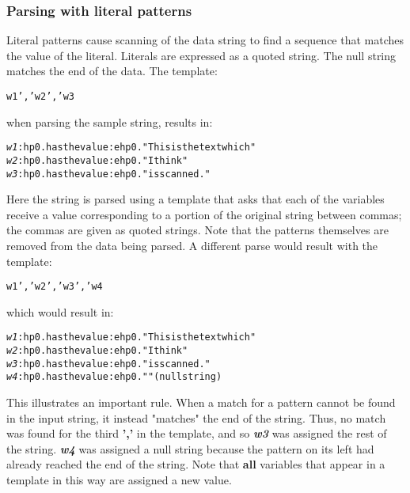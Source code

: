 \subsubsection{Parsing with literal patterns}
\index{,}
\index{,}
 Literal patterns cause scanning of the data string to find a
sequence that matches the value of the literal.  Literals are expressed
as a quoted string.  The null string matches the end of the data.
 The template:
\begin{alltt}
w1 ',' w2 ',' w3
\end{alltt}
when parsing the sample string, results in:
\begin{alltt}
\emph{w1} :hp0.has the value:ehp0. "This is  the text which"
\emph{w2} :hp0.has the value:ehp0. " I think"
\emph{w3} :hp0.has the value:ehp0. "  is scanned."
\end{alltt}
 Here the string is parsed using a template that asks that each of
the variables receive a value corresponding to a portion of the
original string between commas; the commas are given as quoted strings.
Note that the patterns themselves are removed from the data being
parsed.
 A different parse would result with the template:
\begin{alltt}
w1 ',' w2 ',' w3 ',' w4
\end{alltt}
which would result in:
\begin{alltt}
\emph{w1} :hp0.has the value:ehp0. "This is  the text which"
\emph{w2} :hp0.has the value:ehp0. " I think"
\emph{w3} :hp0.has the value:ehp0. "  is scanned."
\emph{w4} :hp0.has the value:ehp0. ""  (null string)
\end{alltt}
 This illustrates an important rule.  When a match for a pattern
cannot be found in the input string, it instead "matches" the end
of the string.  Thus, no match was found for the third \textbf{','} in
the template, and so \textbf{\emph{w3}} was assigned the rest of
the string. \textbf{\emph{w4}} was assigned a null string
because the pattern on its left had already reached the end of the
string.
 Note that \textbf{all} variables that appear in a template in this
way are assigned a new value.
